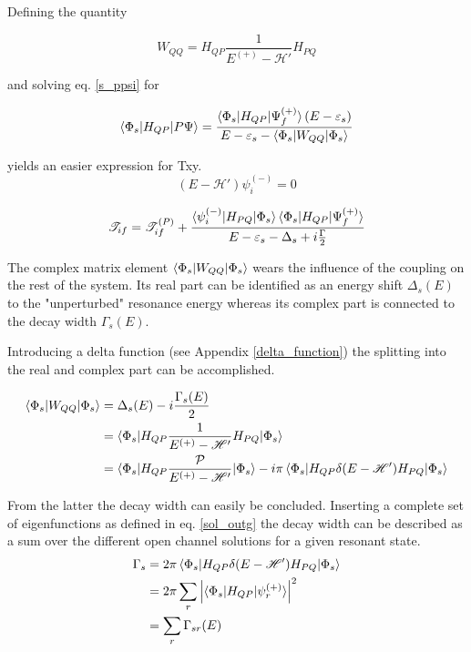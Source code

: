 Defining the quantity

\begin{equation}
  W_{QQ} = H_{QP}\frac{1}{E^{(+)} - \mathscr{H}'}H_{PQ}
\end{equation}

and solving eq. \ref{s_ppsi} for

\begin{equation}
  \braket{\Phi_s|H_{QP}|P\Psi} = \frac{\braket{\Phi_s|H_{QP}|\Psi_f^{(+)}}(E-\varepsilon_s)}
{E - \varepsilon_s - \braket{\Phi_s|W_{QQ}|\Phi_s}}
\end{equation}

yields an easier expression for Txy.
\begin{equation}
  (E - \mathscr{H}') \psi_i^{(-)} = 0
\end{equation}

\begin{equation}
  \mathscr{T}_{if} = \mathscr{T}_{if}^{(P)} + 
                     \frac{\braket{\psi_i^{(-)}|H_{PQ}|\Phi_s}
                           \braket{\Phi_s|H_{QP}|\Psi_f^{(+)}}}
                          {E-\varepsilon_s - \Delta_s + i \frac{\Gamma}{2}}
\end{equation}

The complex matrix element $\braket{\Phi_s|W_{QQ}|\Phi_s}$ wears the influence
of the coupling on the rest of the system. Its real part can be identified as
an energy shift $\Delta_s(E)$ to the "unperturbed" resonance energy whereas its
complex part is connected to the decay width $\Gamma_s(E)$.

Introducing a delta function (see Appendix \ref{delta_function}) the splitting into the real and complex part can be accomplished.

\begin{align}
  \braket{\Phi_s|W_{QQ}|\Phi_s} & = \Delta_s(E) - i \frac{\Gamma_s(E)}{2}\\
                                & = \braket{\Phi_s|H_{QP}
                                    \frac{1}{E^{(+)}  - \mathscr{H}'}H_{PQ}|\Phi_s}\\
                                & = \braket{\Phi_s|H_{QP}
                                    \frac{\mathcal{P}}{E^{(+)} - \mathscr{H}'}|\Phi_s}
                                    - i\pi \braket{\Phi_s|H_{QP}\delta(E-\mathscr{H}')H_{PQ}
                                    |\Phi_s}
\end{align}



From the latter the decay width can easily be concluded. Inserting a complete set
of eigenfunctions as defined in eq. \ref{sol_outg} the decay width can be described
as a sum over the different open channel solutions for a given resonant state.
\begin{align}
  \Gamma_s & = 2 \pi \braket{\Phi_s|H_{QP}\delta(E-\mathscr{H}')H_{PQ}|\Phi_s}\\
           & = 2 \pi \sum\limits_r \left | \braket{\Phi_s|H_{QP}|\psi_r^{(+)}} \right|^2\\
           & = \sum\limits_r \Gamma_{sr}(E)
\end{align}
